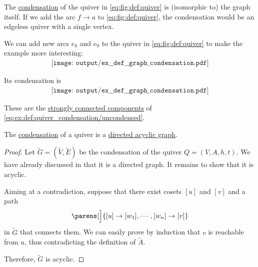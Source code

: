 \begin{example}\label{ex:def:quiver_condensation}
  The \hyperref[def:quiver_condensation]{condensation} of the quiver in \eqref{eq:fig:def:quiver} is (isomorphic to) the graph itself. If we add the arc \( f \to a \) to \eqref{eq:fig:def:quiver}, the condensation would be an edgeless quiver with a single vertex.

  We can add new arcs \( e_8 \) and \( e_9 \) to the quiver in \eqref{eq:fig:def:quiver} to make the example more interesting:
  \begin{equation}\label{eq:ex:def:quiver_condensation/uncondensed}
    \begin{aligned}
      \texttt{[image: output/ex\_\_def\_\_graph\_condensation.pdf]}
    \end{aligned}
  \end{equation}

  Its condensation is
  \begin{equation}\label{eq:ex:def:quiver_condensation/condensed}
    \begin{aligned}
      \texttt{[image: output/ex\_\_def\_\_graph\_condensation.pdf]}
    \end{aligned}
  \end{equation}

  These are the \hyperref[def:quiver_connectedness/strong]{strongly connected components} of \eqref{eq:ex:def:quiver_condensation/uncondensed}.
\end{example}

\begin{proposition}\label{thm:graph_condensation_is_acyclic_dag}
  The \hyperref[def:quiver_condensation]{condensation} of a quiver is a \hyperref[def:undirected_multigraph_path]{directed acyclic graph}.
\end{proposition}
\begin{proof}
  Let \( \widetilde{G} = (\widetilde{V}, \widetilde{E}) \) be the condensation of the quiver \( Q = (V, A, h, t) \). We have already discussed in  that it is a directed graph. It remains to show that it is acyclic.

  Aiming at a contradiction, suppose that there exist cosets \( [u] \) and \( [v] \) and a path
  \begin{equation*}
    \parens[\Big]{ [u] \to [w_1], \cdots, [w_n] \to [v] }
  \end{equation*}
  in \( \widetilde{G} \) that connects them. We can easily prove by induction that \( v \) is reachable from \( u \), thus contradicting the definition of \( \widetilde{A} \).

  Therefore, \( \widetilde{G} \) is acyclic.
\end{proof}

